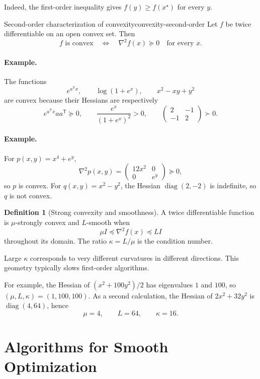 \documentclass[11pt]{article}
\newcommand{\trans}{^{\mathsf T}}
\newcommand{\grad}{\nabla}
\newcommand{\diag}{\operatorname{diag}}
\theoremstyle{definition}
\newtheorem{definition}{Definition}[section]
\theoremstyle{remark}
\begin{document}
Indeed, the first-order inequality gives $f(y)\geq f(x^\star)$ for every $y$.

\begin{keyproposition}{Second-order characterization of convexity}{convexity-second-order}
Let $f$ be twice differentiable on an open convex set. Then
\[
  \boxed{f\text{ is convex}
  \quad\Longleftrightarrow\quad
  \grad^2f(x)\succeq0\quad\text{for every }x.}
\]
\end{keyproposition}

\paragraph{Example.}
The functions
\[
e^{a\trans x},\qquad \log(1+e^x),\qquad x^2-xy+y^2
\]
are convex because their Hessians are respectively
\[
e^{a\trans x}aa\trans\succeq0,
\qquad
\frac{e^x}{(1+e^x)^2}>0,
\qquad
\begin{pmatrix}2&-1\\-1&2\end{pmatrix}\succ0.
\]

\paragraph{Example.}
For $p(x,y)=x^4+e^y$,
\[
\grad^2p(x,y)=\begin{pmatrix}12x^2&0\\0&e^y\end{pmatrix}\succeq0,
\]
so $p$ is convex. For $q(x,y)=x^2-y^2$, the Hessian
$\diag(2,-2)$ is indefinite, so $q$ is not convex.

\begin{definition}[Strong convexity and smoothness]
A twice differentiable function is $\mu$-strongly convex and $L$-smooth when
\[
  \mu I\preceq\grad^2f(x)\preceq LI
\]
throughout its domain. The ratio $\kappa=L/\mu$ is the condition number.
\end{definition}

Large $\kappa$ corresponds to very different curvatures in different
directions. This geometry typically slows first-order algorithms.

For example, the Hessian of $(x^2+100y^2)/2$ has eigenvalues $1$ and $100$,
so $(\mu,L,\kappa)=(1,100,100)$. As a second calculation, the Hessian of
$2x^2+32y^2$ is $\diag(4,64)$, hence
\[
\boxed{\mu=4,\qquad L=64,\qquad\kappa=16.}
\]

\section{Algorithms for Smooth Optimization}
\end{document}
